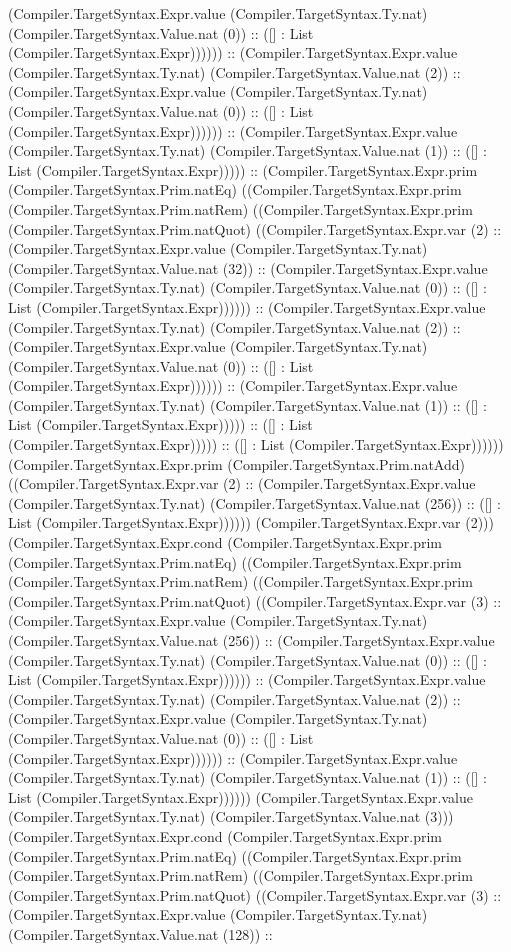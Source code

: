 \documentclass[11pt]{article}
\begin{document}
(Compiler.TargetSyntax.Expr.value (Compiler.TargetSyntax.Ty.nat) (Compiler.TargetSyntax.Value.nat (0)) :: ([] : List (Compiler.TargetSyntax.Expr)))))) :: (Compiler.TargetSyntax.Expr.value (Compiler.TargetSyntax.Ty.nat) (Compiler.TargetSyntax.Value.nat (2)) :: (Compiler.TargetSyntax.Expr.value (Compiler.TargetSyntax.Ty.nat) (Compiler.TargetSyntax.Value.nat (0)) :: ([] : List (Compiler.TargetSyntax.Expr)))))) :: (Compiler.TargetSyntax.Expr.value (Compiler.TargetSyntax.Ty.nat) (Compiler.TargetSyntax.Value.nat (1)) :: ([] : List (Compiler.TargetSyntax.Expr))))) :: (Compiler.TargetSyntax.Expr.prim (Compiler.TargetSyntax.Prim.natEq) ((Compiler.TargetSyntax.Expr.prim (Compiler.TargetSyntax.Prim.natRem) ((Compiler.TargetSyntax.Expr.prim (Compiler.TargetSyntax.Prim.natQuot) ((Compiler.TargetSyntax.Expr.var (2) :: (Compiler.TargetSyntax.Expr.value (Compiler.TargetSyntax.Ty.nat) (Compiler.TargetSyntax.Value.nat (32)) :: (Compiler.TargetSyntax.Expr.value (Compiler.TargetSyntax.Ty.nat) (Compiler.TargetSyntax.Value.nat (0)) :: ([] : List (Compiler.TargetSyntax.Expr)))))) :: (Compiler.TargetSyntax.Expr.value (Compiler.TargetSyntax.Ty.nat) (Compiler.TargetSyntax.Value.nat (2)) :: (Compiler.TargetSyntax.Expr.value (Compiler.TargetSyntax.Ty.nat) (Compiler.TargetSyntax.Value.nat (0)) :: ([] : List (Compiler.TargetSyntax.Expr)))))) :: (Compiler.TargetSyntax.Expr.value (Compiler.TargetSyntax.Ty.nat) (Compiler.TargetSyntax.Value.nat (1)) :: ([] : List (Compiler.TargetSyntax.Expr))))) :: ([] : List (Compiler.TargetSyntax.Expr))))) :: ([] : List (Compiler.TargetSyntax.Expr)))))) (Compiler.TargetSyntax.Expr.prim (Compiler.TargetSyntax.Prim.natAdd) ((Compiler.TargetSyntax.Expr.var (2) :: (Compiler.TargetSyntax.Expr.value (Compiler.TargetSyntax.Ty.nat) (Compiler.TargetSyntax.Value.nat (256)) :: ([] : List (Compiler.TargetSyntax.Expr)))))) (Compiler.TargetSyntax.Expr.var (2))) (Compiler.TargetSyntax.Expr.cond (Compiler.TargetSyntax.Expr.prim (Compiler.TargetSyntax.Prim.natEq) ((Compiler.TargetSyntax.Expr.prim (Compiler.TargetSyntax.Prim.natRem) ((Compiler.TargetSyntax.Expr.prim (Compiler.TargetSyntax.Prim.natQuot) ((Compiler.TargetSyntax.Expr.var (3) :: (Compiler.TargetSyntax.Expr.value (Compiler.TargetSyntax.Ty.nat) (Compiler.TargetSyntax.Value.nat (256)) :: (Compiler.TargetSyntax.Expr.value (Compiler.TargetSyntax.Ty.nat) (Compiler.TargetSyntax.Value.nat (0)) :: ([] : List (Compiler.TargetSyntax.Expr)))))) :: (Compiler.TargetSyntax.Expr.value (Compiler.TargetSyntax.Ty.nat) (Compiler.TargetSyntax.Value.nat (2)) :: (Compiler.TargetSyntax.Expr.value (Compiler.TargetSyntax.Ty.nat) (Compiler.TargetSyntax.Value.nat (0)) :: ([] : List (Compiler.TargetSyntax.Expr)))))) :: (Compiler.TargetSyntax.Expr.value (Compiler.TargetSyntax.Ty.nat) (Compiler.TargetSyntax.Value.nat (1)) :: ([] : List (Compiler.TargetSyntax.Expr)))))) (Compiler.TargetSyntax.Expr.value (Compiler.TargetSyntax.Ty.nat) (Compiler.TargetSyntax.Value.nat (3))) (Compiler.TargetSyntax.Expr.cond (Compiler.TargetSyntax.Expr.prim (Compiler.TargetSyntax.Prim.natEq) ((Compiler.TargetSyntax.Expr.prim (Compiler.TargetSyntax.Prim.natRem) ((Compiler.TargetSyntax.Expr.prim (Compiler.TargetSyntax.Prim.natQuot) ((Compiler.TargetSyntax.Expr.var (3) :: (Compiler.TargetSyntax.Expr.value (Compiler.TargetSyntax.Ty.nat) (Compiler.TargetSyntax.Value.nat (128)) :: 
\end{document}
